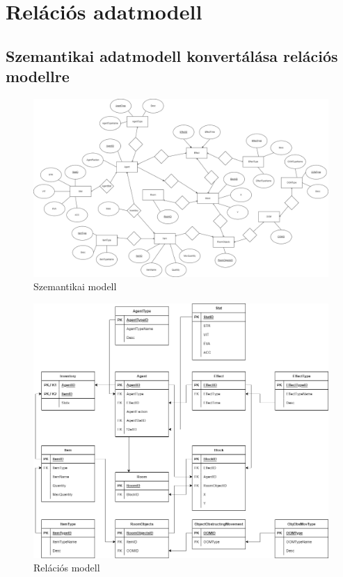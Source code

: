 \section{Relációs adatmodell}


\subsection{Szemantikai adatmodell konvertálása relációs modellre}



\begin{figure}[!ht]
	\centering
	\includegraphics[scale=0.25]{images/szemantikaimodel6.drawio.png}
	\caption{Szemantikai modell}
	\label{fig:Szemantikai modell}
\end{figure}

\begin{figure}[!ht]
	\centering
	\includegraphics[scale=0.35]{images/relaciosadatmodel6.drawio.png}
	\caption{Relációs modell}
	\label{fig:Relációs modell}
\end{figure}

